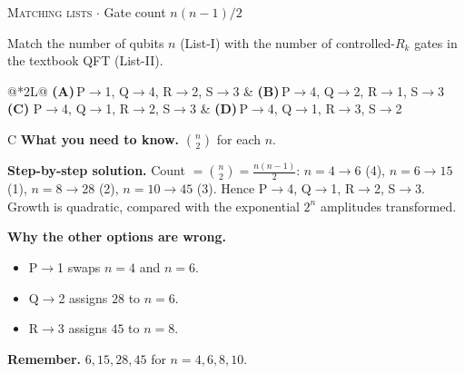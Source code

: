 \documentclass[11pt,a4paper]{article}
\newcommand{\optlabel}[1]{\textbf{(#1)}}
\newcommand{\correctlabel}[1]{\textcolor{okgreen}{\textbf{(#1)}\,\ding{51}}}
\newenvironment{qitem}[1]{\begin{list}{}{\setlength{\leftmargin}{3.3em}\setlength{\labelwidth}{3.1em}%
  \setlength{\labelsep}{0.2em}\setlength{\topsep}{3pt}\setlength{\parsep}{3pt}}\item[\textbf{Q.#1}\hfill]}{\end{list}}
\newcommand{\qsep}{\par\vspace{2pt}{\color{black!15}\hrule}\vspace{4pt}}
\newcommand{\qmeta}[2]{{\footnotesize\color{black!60}\textsc{#1} \;$\cdot$\; #2}\par}
\begin{document}
\begin{qitem}{55}
\qmeta{Matching lists}{Gate count $n(n-1)/2$}
Match the number of qubits $n$ (List-I) with the number of controlled-$R_k$ gates in the textbook QFT (List-II).
\par\smallskip{}
\par\smallskip\noindent\begin{tabularx}{\linewidth}{@{}*{2}{L}@{}}
\optlabel{A}\,P$\to$1, Q$\to$4, R$\to$2, S$\to$3 & \optlabel{B}\,P$\to$4, Q$\to$2, R$\to$1, S$\to$3 \\[3pt]
\correctlabel{C}\,P$\to$4, Q$\to$1, R$\to$2, S$\to$3 & \optlabel{D}\,P$\to$4, Q$\to$1, R$\to$3, S$\to$2
\end{tabularx}
\end{qitem}
\begin{solbox}{C}
\textbf{\color{brand}What you need to know.} $\binom n2$ for each $n$.

\textbf{\color{brand}Step-by-step solution.} Count $= \binom{n}{2} = \frac{n(n-1)}{2}$: $n = 4 \to 6$ (4), $n = 6 \to 15$ (1), $n = 8 \to 28$ (2), $n = 10 \to 45$ (3).
Hence P$\to$4, Q$\to$1, R$\to$2, S$\to$3. Growth is quadratic, compared with the exponential $2^n$ amplitudes transformed.

\textbf{\color{brand}Why the other options are wrong.}
\begin{itemize}[leftmargin=2.4em, itemsep=1pt, topsep=2pt]
\item[\textbf{(A)}] P$\to$1 swaps $n = 4$ and $n = 6$.
\item[\textbf{(B)}] Q$\to$2 assigns $28$ to $n = 6$.
\item[\textbf{(D)}] R$\to$3 assigns $45$ to $n = 8$.
\end{itemize}
\textbf{\color{brand}Remember.} $6, 15, 28, 45$ for $n = 4, 6, 8, 10$.
\end{solbox}
\qsep
\end{document}
